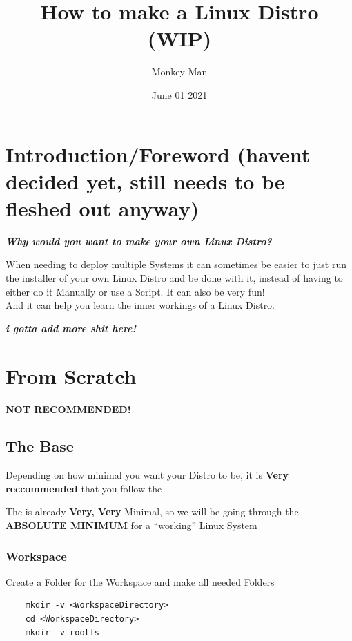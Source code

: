 \documentclass{article}
\author{Monkey Man}
\title{How to make a Linux Distro (WIP)}
\date{June 01 2021}
\begin{document}
\maketitle
\tableofcontents

\section{Introduction/Foreword (havent decided yet, still needs to be fleshed out anyway)}
\begin{center}
	\textit{\textbf{Why would you want to make your own Linux Distro?}}

	When needing to deploy multiple Systems it can sometimes be easier to just run the installer of your own Linux Distro and be done with it, instead of having to either do it Manually or use a Script. It can also be very fun!
	\\And it can help you learn the inner workings of a Linux Distro.

	\textit{\textbf{i gotta add more shit here!}}
\end{center}

\section{From Scratch}
\textbf{NOT RECOMMENDED!}
\subsection{The Base}
\begin{center}
	Depending on how minimal you want your Distro to be, it is \textbf{Very reccommended} that you follow the 

	The  is already \textbf{Very, Very} Minimal, so we will be going through the \textbf{ABSOLUTE MINIMUM} for a ``working'' Linux System 
\end{center}
		\subsubsection{Workspace}
			Create a Folder for the Workspace and make all needed Folders
			
			\begin{lstlisting}
	mkdir -v <WorkspaceDirectory>
	cd <WorkspaceDirectory>
	mkdir -v rootfs
			\end{lstlisting}
\end{document}
